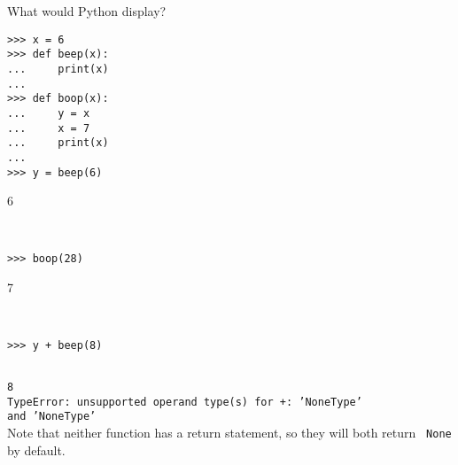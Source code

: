 \question What would Python display?
\begin{lstlisting}
>>> x = 6
>>> def beep(x):
...     print(x)
...
>>> def boop(x):
...     y = x
...     x = 7
...     print(x)
...
>>> y = beep(6)
\end{lstlisting}
\begin{solution}
6
\end{solution}
\begin{lstlisting}


>>> boop(28)
\end{lstlisting}
\begin{solution}
7
\end{solution}
\begin{lstlisting}


>>> y + beep(8)
\end{lstlisting}
\begin{solution}
{\tt ~ \\ 8 \\
TypeError: unsupported operand type(s) for +: 'NoneType' \\ and 'NoneType'} \\
Note that neither function has a return statement, so they will both return {\tt
None} by default.
\end{solution}
